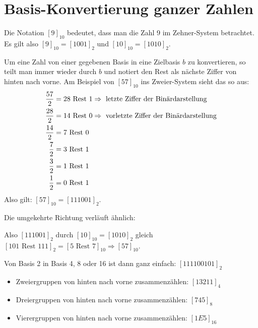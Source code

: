 \section{Basis-Konvertierung ganzer Zahlen}

Die Notation $[9]_{10}$ bedeutet, dass man die Zahl 9 im Zehner-System betrachtet. Es gilt also $[9]_{10} = [1001]_2$ und $[10]_{10}=[1010]_2$. 

Um eine Zahl von einer gegebenen Basis in eine Zielbasis $b$ zu konvertieren, so teilt man immer wieder durch $b$ und notiert den Rest als nächste Ziffer von hinten nach vorne. Am Beispiel von $[57]_{10}$ ins Zweier-System sieht das so aus:
\begin{align}
	\frac{57}{2} &= 28\text{ Rest } 1 \Rightarrow\text{ letzte Ziffer der Binärdarstellung} \notag \\
	\frac{28}{2} &= 14\text{ Rest } 0 \Rightarrow\text{ vorletzte Ziffer der Binärdarstellung} \notag \\
	\frac{14}{2} &= 7\text{ Rest } 0 \notag \\
	\frac{7}{2} &= 3\text{ Rest } 1 \notag \\
	\frac{3}{2} &= 1\text{ Rest } 1 \notag \\
	\frac{1}{2} &= 0\text{ Rest } 1 \notag
\end{align}
Also gilt: $[57]_{10}=[111001]_2$.

Die umgekehrte Richtung verläuft ähnlich:
\begin{center}
\end{center}
Also $[111001]_2$ durch $[10]_{10}=[1010]_2$ gleich $[101\text{ Rest }111]_2=[5\text{ Rest }7]_{10}\Rightarrow [57]_{10}$.

Von Basis 2 in Basis 4, 8 oder 16 ist dann ganz einfach: $[111100101]_2$
\begin{itemize}
	\item Zweiergruppen von hinten nach vorne zusammenzählen: $[13211]_4$
	\item Dreiergruppen von hinten nach vorne zusammenzählen: $[745]_8$
	\item Vierergruppen von hinten nach vorne zusammenzählen: $[1E5]_{16}$
\end{itemize}